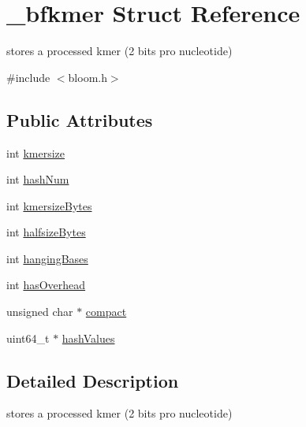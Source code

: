 \hypertarget{struct__bfkmer}{\section{\+\_\+bfkmer Struct Reference}
\label{struct__bfkmer}
}


stores a processed kmer (2 bits pro nucleotide)  




{\ttfamily \#include $<$bloom.\+h$>$}

\subsection*{Public Attributes}
\begin{DoxyCompactItemize}
\item 
int \hyperlink{struct__bfkmer_aec3b3cd33fdfbd71f38b7c9a21a00574}{kmersize}
\item 
int \hyperlink{struct__bfkmer_a5694e46bd18449baa91d25178d1634bf}{hash\+Num}
\item 
int \hyperlink{struct__bfkmer_aad605c14068200c97520fcd6e49f3e7c}{kmersize\+Bytes}
\item 
int \hyperlink{struct__bfkmer_a8bb57e85f90ed06b9de391be9eeba3e8}{halfsize\+Bytes}
\item 
int \hyperlink{struct__bfkmer_a151a92f8ca72f2d778f9ad26e96b35ae}{hanging\+Bases}
\item 
int \hyperlink{struct__bfkmer_a78787413a5bdf782f32ff66a8f21be20}{has\+Overhead}
\item 
unsigned char $\ast$ \hyperlink{struct__bfkmer_a42dcd2ff2a59169fb66f89fd0aa892a9}{compact}
\item 
uint64\+\_\+t $\ast$ \hyperlink{struct__bfkmer_afa4bc228a6d89c923dbda0357071187a}{hash\+Values}
\end{DoxyCompactItemize}


\subsection{Detailed Description}
stores a processed kmer (2 bits pro nucleotide) 

